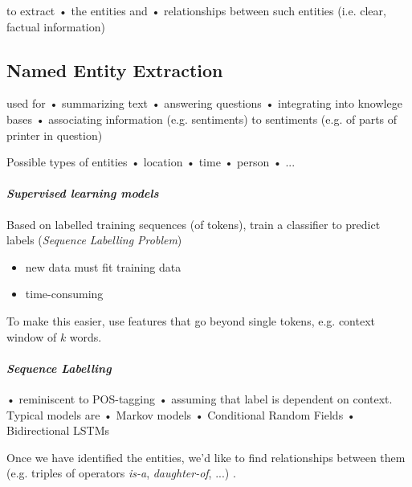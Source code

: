 \documentclass[10pt,twocolumn]{article}
\begin{document}
to extract  • the entities and  • relationships between such entities (i.e.
clear, factual information)

\subsection{Named Entity Extraction}

used for  • summarizing text  • answering questions  • integrating into knowlege
bases  • associating information (e.g. sentiments) to sentiments (e.g. of parts
of printer in question)

Possible types of entities  • location  • time  • person  • ...

\paragraph{\textit{Supervised learning models}} Based on labelled training
sequences (of tokens), train a classifier to predict labels (\textit{Sequence
  Labelling Problem})
\begin{itemize}
\item new data must fit training data
\item time-consuming
\end{itemize}

To make this easier, use features that go beyond single tokens, e.g. context
window of $k$ words.

\paragraph{\textit{Sequence Labelling}}  • reminiscent to POS-tagging  • assuming
that label is dependent on context. Typical models are  • Markov models  •
Conditional Random Fields  • Bidirectional LSTMs

Once we have identified the entities, we'd like to find relationships between
them (e.g. triples of operators \textit{is-a}, \textit{daughter-of}, ...)
.
\end{document}
